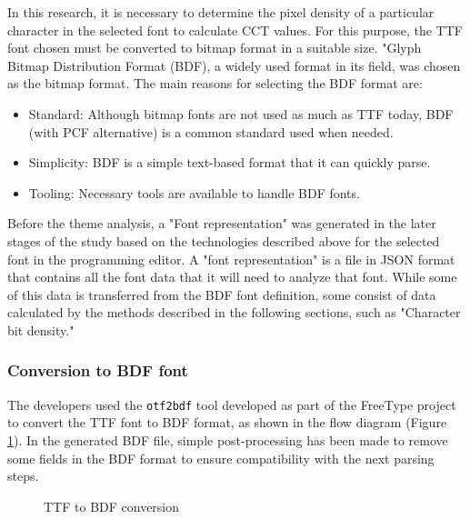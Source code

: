 \documentclass{article}
\begin{document}
In this research, it is necessary to determine the pixel density of a particular character in the selected font to calculate CCT values. For this purpose, the TTF font chosen must be converted to bitmap format in a suitable size. "Glyph Bitmap Distribution Format (BDF), a widely used format in its field, was chosen as the bitmap format. The main reasons for selecting the BDF format are:

\begin{itemize}
  \item Standard: Although bitmap fonts are not used as much as TTF today, BDF (with PCF alternative) is a common standard used when needed.
  \item Simplicity: BDF is a simple text-based format that it can quickly parse.
  \item Tooling: Necessary tools are available to handle BDF fonts.
\end{itemize}

Before the theme analysis, a "Font representation" was generated in the later stages of the study based on the technologies described above for the selected font in the programming editor. A "font representation" is a file in JSON format that contains all the font data that it will need to analyze that font. While some of this data is transferred from the BDF font definition, some consist of data calculated by the methods described in the following sections, such as "Character bit density."

\subsubsection{Conversion to BDF font}

The developers used the \texttt{otf2bdf} tool\cite{otf2bdf2008man} developed as part of the FreeType project\cite{freetype2022project} to convert the TTF font to BDF format, as shown in the flow diagram (Figure \ref{fig:otf2bdf}). In the generated BDF file, simple post-processing has been made to remove some fields in the BDF format to ensure compatibility with the next parsing steps.

\begin{figure}[H]
  \caption{TTF to BDF conversion}
  \label{fig:otf2bdf}

\end{figure}
\end{document}
